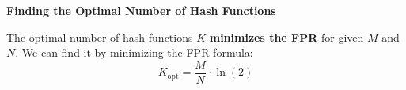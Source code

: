 \highspace
\begin{flushleft}
    \textcolor{Green3}{ \textbf{Finding the Optimal Number of Hash Functions}}
\end{flushleft}
The optimal number of hash functions $K$ \textbf{minimizes the FPR} for given $M$ and $N$. We can find it by minimizing the FPR formula:
\begin{equation}
    K_{\text{opt}} = \dfrac{M}{N} \cdot \ln \left(2\right)
\end{equation}